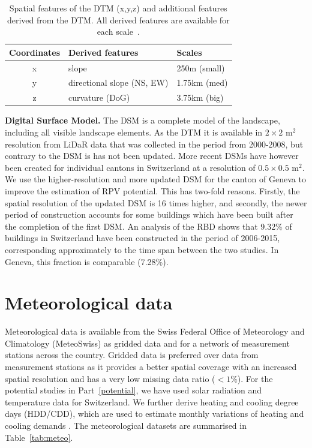 \begin{table}[tb]
\centering
\footnotesize
\caption{Spatial features of the DTM (x,y,z) and additional features derived from the DTM. All derived features are available for each scale~\cite{robert_spatial_2012}.}
\label{tab:DTM_ftrs}
\begin{tabular}{cll}
\hline
\textbf{Coordinates} & \textbf{Derived features} & \textbf{Scales} \\ \hline
x                    & slope                           & 250m (small)    \\
y                    & directional slope (NS, EW)      & 1.75km (med)    \\
z                    & curvature (DoG)                 & 3.75km (big)    \\ \hline
\end{tabular}
\end{table}

\textbf{Digital Surface Model.} The DSM is a complete model of the landscape, including all visible landscape elements. As the DTM it is available  in $2\times2$ m$^2$ resolution from LiDaR data that was collected in the period from 2000-2008, but contrary to the DSM is has not been updated. More recent DSMs have however been created for individual cantons in Switzerland at a resolution of $0.5\times0.5$ m$^2$. 
%
We use the higher-resolution and more updated DSM for the canton of Geneva to improve the estimation of RPV potential.
This has two-fold reasons. Firstly, the spatial resolution of the updated DSM is 16 times higher, and secondly, the newer period of construction accounts for some buildings which have been built after the completion of the first DSM.
An analysis of the RBD shows that 9.32\% of buildings in Switzerland have been constructed in the period of 2006-2015, corresponding approximately to the time span between the two studies. In Geneva, this fraction is comparable (7.28\%).


\section{Meteorological data}
\label{data_meteo}
Meteorological data is available from the Swiss Federal Office of Meteorology and Climatology (MeteoSwiss) as gridded data and for a network of measurement stations across the country. 
Gridded data is preferred over data from measurement stations as it provides a better spatial coverage with an increased spatial resolution and has a very low missing data ratio ($<1\%$). 
For the potential studies in Part~\ref{potential}, we have used solar radiation and temperature data for Switzerland. We further derive heating and cooling degree days (HDD/CDD), which are used to estimate monthly variations of heating and cooling demands \cite{stadler_contribution_2018}. The meteorological datasets are summarised in Table~\ref{tab:meteo}.

